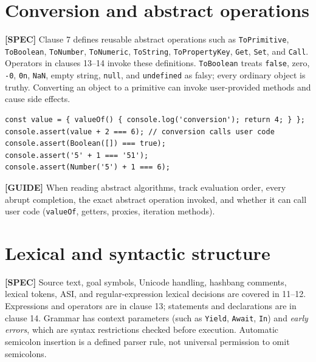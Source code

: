 \documentclass[11pt,letterpaper]{article}
\newcommand{\passthrough}[1]{#1}
\begin{document}
\section{Conversion and abstract operations}\label{conversion-and-abstract-operations}

\textbf{{[}SPEC{]}} Clause 7 defines reusable abstract operations such as \passthrough{\lstinline!ToPrimitive!}, \passthrough{\lstinline!ToBoolean!}, \passthrough{\lstinline!ToNumber!}, \passthrough{\lstinline!ToNumeric!}, \passthrough{\lstinline!ToString!}, \passthrough{\lstinline!ToPropertyKey!}, \passthrough{\lstinline!Get!}, \passthrough{\lstinline!Set!}, and \passthrough{\lstinline!Call!}. Operators in clauses 13--14 invoke these definitions. \passthrough{\lstinline!ToBoolean!} treats \passthrough{\lstinline!false!}, zero, \passthrough{\lstinline!-0!}, \passthrough{\lstinline!0n!}, \passthrough{\lstinline!NaN!}, empty string, \passthrough{\lstinline!null!}, and \passthrough{\lstinline!undefined!} as falsy; every ordinary object is truthy. Converting an object to a primitive can invoke user-provided methods and cause side effects.

\begin{lstlisting}
const value = { valueOf() { console.log('conversion'); return 4; } };
console.assert(value + 2 === 6); // conversion calls user code
console.assert(Boolean([]) === true);
console.assert('5' + 1 === '51');
console.assert(Number('5') + 1 === 6);
\end{lstlisting}

\textbf{{[}GUIDE{]}} When reading abstract algorithms, track evaluation order, every abrupt completion, the exact abstract operation invoked, and whether it can call user code (\passthrough{\lstinline!valueOf!}, getters, proxies, iteration methods).

\section{Lexical and syntactic structure}\label{lexical-and-syntactic-structure}

\textbf{{[}SPEC{]}} Source text, goal symbols, Unicode handling, hashbang comments, lexical tokens, ASI, and regular-expression lexical decisions are covered in 11--12. Expressions and operators are in clause 13; statements and declarations are in clause 14. Grammar has context parameters (such as \passthrough{\lstinline!Yield!}, \passthrough{\lstinline!Await!}, \passthrough{\lstinline!In!}) and \emph{early errors}, which are syntax restrictions checked before execution. Automatic semicolon insertion is a defined parser rule, not universal permission to omit semicolons.
\end{document}

